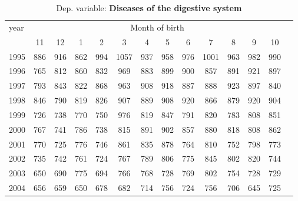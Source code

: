  \begin{table}[H] \begin{threeparttable} \centering \caption{Dep. variable: \textbf{Diseases of the digestive system}} {\def\sym#1{\ifmmode^{#1}\else\(^{#1}\)\fi} \begin{tabular}{l*{13}{c}} \toprule year & \multicolumn{12}{c}{Month of birth} \\ \cmidrule(lr){2-13} 
            &          11&          12&           1&           2&           3&           4&           5&           6&           7&           8&           9&          10\\
1995        &         886&         916&         862&         994&        1057&         937&         958&         976&        1001&         963&         982&         990\\
1996        &         765&         812&         860&         832&         969&         883&         899&         900&         857&         891&         921&         897\\
1997        &         793&         843&         822&         868&         963&         908&         918&         887&         888&         923&         897&         840\\
1998        &         846&         790&         819&         826&         907&         889&         908&         920&         866&         879&         920&         904\\
1999        &         726&         738&         770&         750&         976&         819&         847&         791&         820&         783&         808&         851\\
2000        &         767&         741&         786&         738&         815&         891&         902&         857&         880&         818&         808&         862\\
2001        &         770&         725&         776&         746&         861&         835&         878&         764&         810&         752&         798&         773\\
2002        &         735&         742&         761&         724&         767&         789&         806&         775&         845&         802&         820&         744\\
2003        &         650&         690&         775&         694&         766&         768&         728&         769&         802&         754&         728&         729\\
2004        &         656&         659&         650&         678&         682&         714&         756&         724&         756&         706&         645&         725\\

\end{tabular}}
\end{threeparttable}
\end{table}

